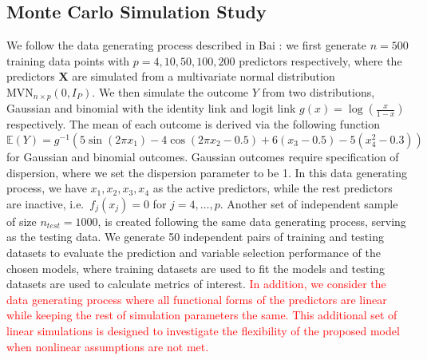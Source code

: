 \documentclass[AMA,STIX1COL,]{WileyNJD-v2}
\begin{document}
\subsection{Monte Carlo Simulation Study}

We follow the data generating process described in Bai \citep{Bai2021}:
we first generate \(n=500\) training data points with
\(p=4, 10, 50, 100, 200\) predictors respectively, where the predictors
\(\boldsymbol{X}\) are simulated from a multivariate normal distribution
\(\text{MVN}_{n\times p}(0, I_{P})\). We then simulate the outcome \(Y\)
from two distributions, Gaussian and binomial with the identity link and
logit link \(g(x) = \log(\frac{x}{1-x})\) respectively. The mean of each
outcome is derived via the following function \[
\mathbb{E}(Y) = g^{-1}(5 \sin(2\pi x_1) - 4 \cos(2\pi x_2 -0.5) + 6(x_3-0.5) - 5(x_4^2 -0.3))
\] for Gaussian and binomial outcomes. Gaussian outcomes require
specification of dispersion, where we set the dispersion parameter to be
1. In this data generating process, we have \(x_1, x_2, x_3, x_4\) as
the active predictors, while the rest predictors are inactive,
i.e.~\(f_j(x_j) = 0\) for \(j = 4, \dots, p\). Another set of
independent sample of size \(n_{test}=1000\), is created following the
same data generating process, serving as the testing data. We generate
50 independent pairs of training and testing datasets to evaluate the
prediction and variable selection performance of the chosen models,
where training datasets are used to fit the models and testing datasets
are used to calculate metrics of interest.
\textcolor{red}{In addition, we consider the data generating process where all functional forms of the predictors are linear while keeping the rest of simulation parameters the same. This additional set of linear simulations is designed to investigate the flexibility of the proposed model when nonlinear assumptions are not met.}
\end{document}
